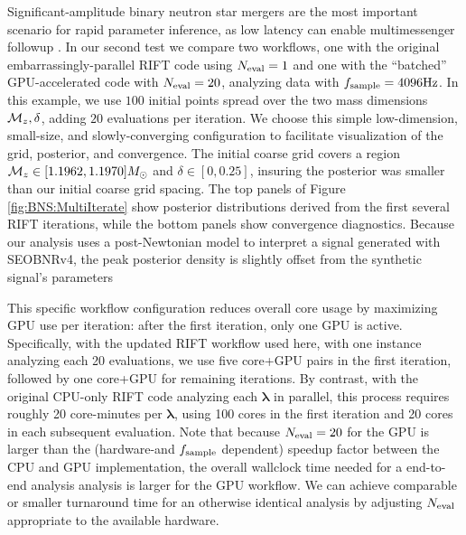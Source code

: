 \documentclass[twocolumn,prd,nofootinbib]{revtex4}
\newcommand\unit[1]{{\rm #1}}
\newcommand\editremark[1]{{\color{red} #1}}
\newcommand{\mc}{{\cal M}}
\begin{document}
Significant-amplitude  binary neutron star mergers are the most important scenario for rapid parameter inference, as low
latency can enable multimessenger followup  \cite{LIGO-O2-Catalog}.    
% 
In our second test we compare two workflows, one with the original embarrassingly-parallel RIFT code using $N_{\rm
  eval}=1$ and one with the
``batched'' GPU-accelerated code with $N_{\rm eval}=20$, analyzing data with $f_{\rm sample}=4096\unit{Hz}$.    
In this example, we use $100$ initial points spread over the two mass dimensions $\mc_z,\delta$, adding $20$ evaluations per
iteration.   We
choose this simple low-dimension, small-size, and slowly-converging configuration to facilitate visualization of the grid, posterior, and convergence.     The initial coarse grid covers a region $\mc_z\in[1.1962,1.1970] M_\odot$ and $\delta \in [0,0.25]$,  insuring the posterior was smaller than our initial
coarse grid spacing.     The top  panels of Figure  \ref{fig:BNS:MultiIterate} show posterior distributions derived
from the first several RIFT iterations, while the bottom panels show convergence diagnostics.
Because our analysis uses a post-Newtonian model to interpret a signal generated with SEOBNRv4, the peak posterior
density is slightly  offset
 from the synthetic signal's parameters


This specific workflow configuration  reduces overall core usage by maximizing GPU use per iteration: after the first
iteration, only one GPU is active.   
Specifically,  with the updated RIFT workflow used here, with one instance analyzing each 20 evaluations,  we use five
core+GPU pairs in the
first iteration, followed by one core+GPU for remaining iterations.
By contrast, with the original CPU-only RIFT code analyzing each $\bm{\lambda}$ in parallel, this process requires roughly 20 core-minutes
per $\bm{\lambda}$, using 100 cores in the first iteration and 20 cores in each
subsequent evaluation.   
Note that  because   $N_{\rm eval}=20$ for the GPU is larger than the (hardware-and $f_{\rm sample}$ dependent)  speedup factor between the CPU and
GPU implementation, the overall wallclock time needed for a end-to-end
analysis analysis is larger for the GPU workflow.
We can achieve comparable or smaller turnaround time for an otherwise identical analysis by adjusting $N_{\rm eval}$ appropriate to the available hardware.
\end{document}
